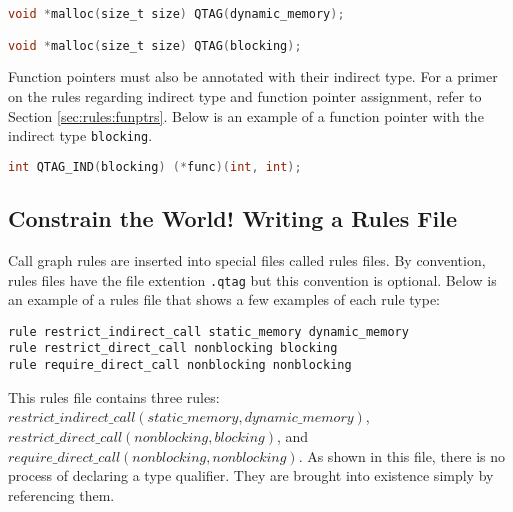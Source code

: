 \noindent\begin{minipage}[t]{\linewidth}
\begin{lstlisting}[language=C]
void *malloc(size_t size) QTAG(dynamic_memory);

void *malloc(size_t size) QTAG(blocking);
\end{lstlisting}
\end{minipage}

Function pointers must also be annotated with their indirect type.  For a primer on the rules regarding indirect type and function pointer assignment, refer to Section \ref{sec:rules:funptrs}.  Below is an example of a function pointer with the indirect type \lstinline{blocking}.

\noindent\begin{minipage}[t]{\linewidth}
\begin{lstlisting}[language=C++]
int QTAG_IND(blocking) (*func)(int, int);
\end{lstlisting}
\end{minipage}

\subsection{Constrain the World!  Writing a Rules File}\label{sec:operate:rules}

Call graph rules are inserted into special files called rules files.  By convention, rules files have the file extention \lstinline{.qtag} but this convention is optional.  Below is an example of a rules file that shows a few examples of each rule type:

\noindent\begin{minipage}[t]{\linewidth}
\begin{lstlisting}
rule restrict_indirect_call static_memory dynamic_memory
rule restrict_direct_call nonblocking blocking
rule require_direct_call nonblocking nonblocking
\end{lstlisting}
\end{minipage}

\begin{sloppypar}
This rules file contains three rules: $restrict\_indirect\_call(\allowbreak static\_memory,\allowbreak dynamic\_memory)$, $restrict\_direct\_call(\allowbreak nonblocking,\allowbreak blocking)$, and $require\_direct\_call(\allowbreak nonblocking,\allowbreak nonblocking)$.  As shown in this file, there is no process of declaring a type qualifier.  They are brought into existence simply by referencing them.  
\end{sloppypar}

